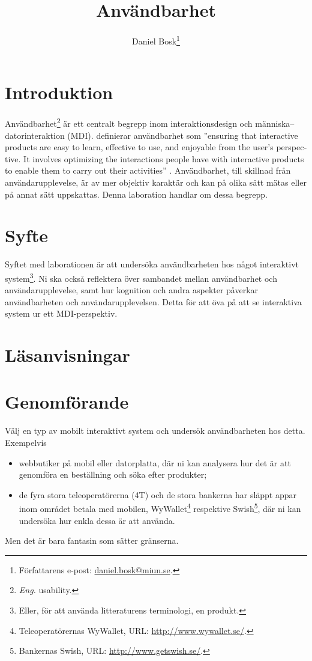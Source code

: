 \documentclass[a4paper,logo,nocourse]{miunasgn}
\title{Användbarhet}
\author{Daniel Bosk\footnote{%
	Författarens e-post: \href{mailto:daniel.bosk@miun.se}{daniel.bosk@miun.se}.
}}
\date{\svnId}
\begin{document}
\maketitle
\thispagestyle{foot}
\tableofcontents


\section{Introduktion}
\label{sec:Introduktion}
Användbarhet\footnote{%
	\emph{Eng.} usability.
} är ett centralt begrepp inom interaktionsdesign och 
människa--datorinteraktion (MDI).
\citeauthor{Sharp2011idb} definierar användbarhet som
''\foreignlanguage{english}{ensuring that interactive products are easy to 
learn, effective to use, and enjoyable from the user's perspective.
It involves optimizing the interactions people have with interactive products 
to enable them to carry out their activities}'' \citep[sidan 19]{Sharp2011idb}.
Användbarhet, till skillnad från användarupplevelse, är av mer objektiv 
karaktär och kan på olika sätt mätas eller på annat sätt uppskattas.
Denna laboration handlar om dessa begrepp.


\section{Syfte}
\label{sec:Syfte}
Syftet med laborationen är att undersöka användbarheten hos något interaktivt 
system\footnote{%
  Eller, för att använda litteraturens terminologi, en  produkt.
}.
Ni ska också reflektera över sambandet mellan användbarhet och 
användarupplevelse, samt hur kognition och andra aspekter påverkar 
användbarheten och användarupplevelsen.
Detta för att öva på att se interaktiva system ur ett MDI-perspektiv.


\section{Läsanvisningar}
\label{sec:Lasanvisningar}



\section{Genomförande}
\label{sec:Genomforande}
Välj en typ av mobilt interaktivt system och undersök användbarheten hos detta.
Exempelvis
\begin{itemize}
  \item webbutiker på mobil eller datorplatta, där ni kan analysera hur det är 
    att genomföra en beställning och söka efter produkter;
  \item de fyra stora teleoperatörerna (4T) och de stora bankerna har släppt 
    appar inom området betala med mobilen, WyWallet\footnote{%
      Teleoperatörernas WyWallet, URL: \url{http://www.wywallet.se/}.
    } respektive Swish\footnote{%
      Bankernas Swish, URL: \url{http://www.getswish.se/}.
    }, där ni kan undersöka hur enkla dessa är att använda.
\end{itemize}
Men det är bara fantasin som sätter gränserna.
\end{document}
